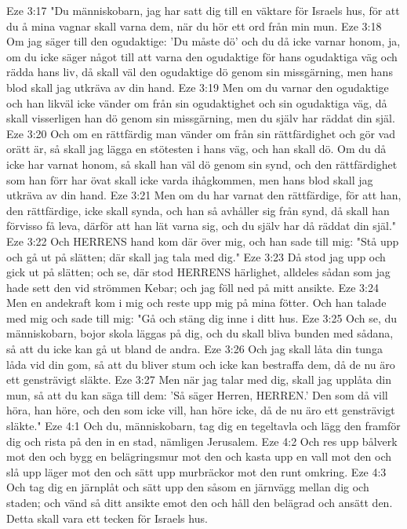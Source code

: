 Eze 3:17  "Du människobarn, jag har satt dig till en väktare för Israels hus, för att du å mina vagnar skall varna dem, när du hör ett ord från min mun.
Eze 3:18  Om jag säger till den ogudaktige: 'Du måste dö' och du då icke varnar honom, ja, om du icke säger något till att varna den ogudaktige för hans ogudaktiga väg och rädda hans liv, då skall väl den ogudaktige dö genom sin missgärning, men hans blod skall jag utkräva av din hand.
Eze 3:19  Men om du varnar den ogudaktige och han likväl icke vänder om från sin ogudaktighet och sin ogudaktiga väg, då skall visserligen han dö genom sin missgärning, men du själv har räddat din själ.
Eze 3:20  Och om en rättfärdig man vänder om från sin rättfärdighet och gör vad orätt är, så skall jag lägga en stötesten i hans väg, och han skall dö. Om du då icke har varnat honom, så skall han väl dö genom sin synd, och den rättfärdighet som han förr har övat skall icke varda ihågkommen, men hans blod skall jag utkräva av din hand.
Eze 3:21  Men om du har varnat den rättfärdige, för att han, den rättfärdige, icke skall synda, och han så avhåller sig från synd, då skall han förvisso få leva, därför att han lät varna sig, och du själv har då räddat din själ."
Eze 3:22  Och HERRENS hand kom där över mig, och han sade till mig: "Stå upp och gå ut på slätten; där skall jag tala med dig."
Eze 3:23  Då stod jag upp och gick ut på slätten; och se, där stod HERRENS härlighet, alldeles sådan som jag hade sett den vid strömmen Kebar; och jag föll ned på mitt ansikte.
Eze 3:24  Men en andekraft kom i mig och reste upp mig på mina fötter. Och han talade med mig och sade till mig: "Gå och stäng dig inne i ditt hus.
Eze 3:25  Och se, du människobarn, bojor skola läggas på dig, och du skall bliva bunden med sådana, så att du icke kan gå ut bland de andra.
Eze 3:26  Och jag skall låta din tunga låda vid din gom, så att du bliver stum och icke kan bestraffa dem, då de nu äro ett gensträvigt släkte.
Eze 3:27  Men när jag talar med dig, skall jag upplåta din mun, så att du kan säga till dem: 'Så säger Herren, HERREN.' Den som då vill höra, han höre, och den som icke vill, han höre icke, då de nu äro ett gensträvigt släkte."
Eze 4:1  Och du, människobarn, tag dig en tegeltavla och lägg den framför dig och rista på den in en stad, nämligen Jerusalem.
Eze 4:2  Och res upp bålverk mot den och bygg en belägringsmur mot den och kasta upp en vall mot den och slå upp läger mot den och sätt upp murbräckor mot den runt omkring.
Eze 4:3  Och tag dig en järnplåt och sätt upp den såsom en järnvägg mellan dig och staden; och vänd så ditt ansikte emot den och håll den belägrad och ansätt den. Detta skall vara ett tecken för Israels hus.
